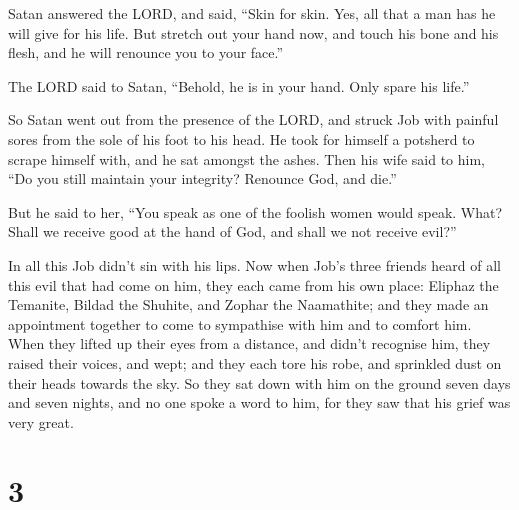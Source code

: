  Satan answered the LORD, and said, ``Skin for skin. Yes,
all that a man has he will give for his life.  But stretch
out your hand now, and touch his bone and his flesh, and he will
renounce you to your face.''

 The LORD said to Satan, ``Behold, he is in your hand.
Only spare his life.''

 So Satan went out from the presence of the LORD, and
struck Job with painful sores from the sole of his foot to his head.
 He took for himself a potsherd to scrape himself with,
and he sat amongst the ashes.  Then his wife said to him,
``Do you still maintain your integrity? Renounce God, and die.''

 But he said to her, ``You speak as one of the foolish
women would speak. What? Shall we receive good at the hand of God, and
shall we not receive evil?''

In all this Job didn't sin with his lips.  Now when Job's
three friends heard of all this evil that had come on him, they each
came from his own place: Eliphaz the Temanite, Bildad the Shuhite, and
Zophar the Naamathite; and they made an appointment together to come to
sympathise with him and to comfort him.  When they lifted
up their eyes from a distance, and didn't recognise him, they raised
their voices, and wept; and they each tore his robe, and sprinkled dust
on their heads towards the sky.  So they sat down with
him on the ground seven days and seven nights, and no one spoke a word
to him, for they saw that his grief was very great.

\hypertarget{section-2}{%
\section{3}\label{section-2}}

